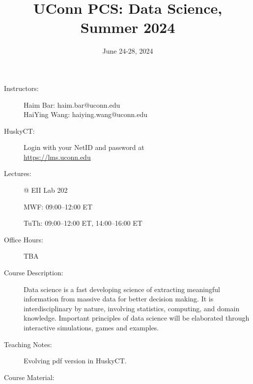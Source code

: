 \documentclass[twocolumn,hidelinks]{article}
\begin{document}
\title{UConn PCS: Data Science, Summer 2024}
\date{June 24-28, 2024}
\maketitle

\thispagestyle{fancy}


\begin{description}
\item[Instructors:] \hspace{0pt}

  Haim Bar: haim.bar@uconn.edu\\
  HaiYing Wang: haiying.wang@uconn.edu

\item[HuskyCT:] Login with your NetID and password at\\
  \url{https://lms.uconn.edu}
  
\item[Lectures:] @ EII Lab 202
  
  MWF: 09:00--12:00 ET

  TuTh: 09:00--12:00 ET, 14:00--16:00 ET

\item[Office Hours:]
  TBA

\item[Course Description:]
Data science is a fast developing science of extracting meaningful
information from massive data for better decision making. It is
interdisciplinary by nature, involving statistics, computing, and
domain knowledge. Important principles of data science will be
elaborated through interactive simulations, games and examples.


\item[Teaching Notes:] 

  Evolving pdf version in HuskyCT.
  
\item[Course Material:]


\end{description}
\end{document}
